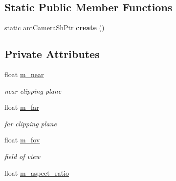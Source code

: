 \subsection*{Static Public Member Functions}
\begin{DoxyCompactItemize}
\item 
\hypertarget{classant_camera_ae545dc3467f359f7161f196cc84bf192}{static ant\+Camera\+Sh\+Ptr {\bfseries create} ()}\label{classant_camera_ae545dc3467f359f7161f196cc84bf192}

\end{DoxyCompactItemize}
\subsection*{Private Attributes}
\begin{DoxyCompactItemize}
\item 
\hypertarget{classant_camera_a29ecb5d46ef6f2bbd3adca58208c71c0}{float \hyperlink{classant_camera_a29ecb5d46ef6f2bbd3adca58208c71c0}{m\+\_\+near}}\label{classant_camera_a29ecb5d46ef6f2bbd3adca58208c71c0}

\begin{DoxyCompactList}\small\item\em near clipping plane \end{DoxyCompactList}\item 
\hypertarget{classant_camera_ad3f5a820c26d66965b42015f153dd868}{float \hyperlink{classant_camera_ad3f5a820c26d66965b42015f153dd868}{m\+\_\+far}}\label{classant_camera_ad3f5a820c26d66965b42015f153dd868}

\begin{DoxyCompactList}\small\item\em far clipping plane \end{DoxyCompactList}\item 
\hypertarget{classant_camera_adb5f87e2729f8dbc0a702f809982409f}{float \hyperlink{classant_camera_adb5f87e2729f8dbc0a702f809982409f}{m\+\_\+fov}}\label{classant_camera_adb5f87e2729f8dbc0a702f809982409f}

\begin{DoxyCompactList}\small\item\em field of view \end{DoxyCompactList}\item 
\hypertarget{classant_camera_a82f11705fc77ba2e86c667e31ea41e32}{float \hyperlink{classant_camera_a82f11705fc77ba2e86c667e31ea41e32}{m\+\_\+aspect\+\_\+ratio}}\label{classant_camera_a82f11705fc77ba2e86c667e31ea41e32}


\end{DoxyCompactItemize}
